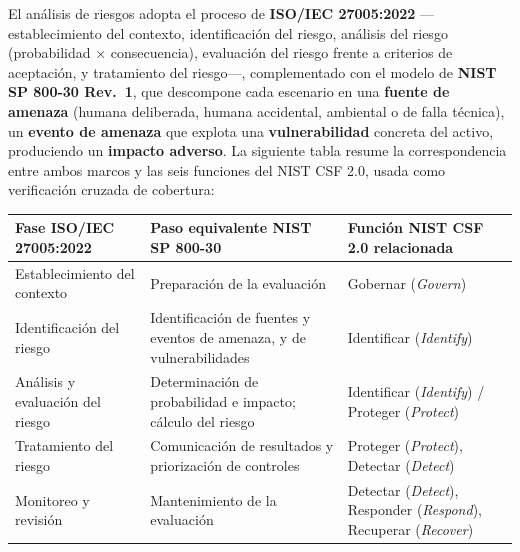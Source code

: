 \documentclass[11pt,a4paper]{article}
\begin{document}
El análisis de riesgos adopta el proceso de \textbf{ISO/IEC 27005:2022} ---establecimiento del contexto, identificación del riesgo, análisis del riesgo (probabilidad × consecuencia), evaluación del riesgo frente a criterios de aceptación, y tratamiento del riesgo---, complementado con el modelo de \textbf{NIST SP 800-30 Rev.~1}, que descompone cada escenario en una \textbf{fuente de amenaza} (humana deliberada, humana accidental, ambiental o de falla técnica), un \textbf{evento de amenaza} que explota una \textbf{vulnerabilidad} concreta del activo, produciendo un \textbf{impacto adverso}. La siguiente tabla resume la correspondencia entre ambos marcos y las seis funciones del NIST CSF 2.0, usada como verificación cruzada de cobertura:

{\small
\begin{longtable}[]{@{}
  >{\raggedright\arraybackslash}p{}
  >{\raggedright\arraybackslash}p{}
  >{\raggedright\arraybackslash}p{}@{}}
\toprule\noalign{}
\begin{minipage}[b]{\linewidth}\raggedright
Fase ISO/IEC 27005:2022
\end{minipage} & \begin{minipage}[b]{\linewidth}\raggedright
Paso equivalente NIST SP 800-30
\end{minipage} & \begin{minipage}[b]{\linewidth}\raggedright
Función NIST CSF 2.0 relacionada
\end{minipage} \\
\midrule\noalign{}
\endhead
\bottomrule\noalign{}
\endlastfoot
Establecimiento del contexto & Preparación de la evaluación & Gobernar (\emph{Govern}) \\
Identificación del riesgo & Identificación de fuentes y eventos de amenaza, y de vulnerabilidades & Identificar (\emph{Identify}) \\
Análisis y evaluación del riesgo & Determinación de probabilidad e impacto; cálculo del riesgo & Identificar (\emph{Identify}) / Proteger (\emph{Protect}) \\
Tratamiento del riesgo & Comunicación de resultados y priorización de controles & Proteger (\emph{Protect}), Detectar (\emph{Detect}) \\
Monitoreo y revisión & Mantenimiento de la evaluación & Detectar (\emph{Detect}), Responder (\emph{Respond}), Recuperar (\emph{Recover}) \\
\end{longtable}
}
\end{document}
